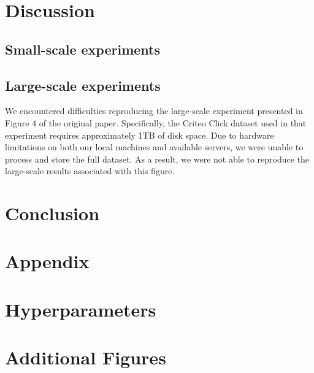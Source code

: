 \documentclass[a4paper,twocolumn]{article} %
\begin{document}
\section{Discussion}
\subsection{ Small-scale experiments}

\subsection{ Large-scale experiments}
We encountered difficulties reproducing the large-scale experiment presented in Figure 4 of the original paper. Specifically, the Criteo Click dataset used in that experiment requires approximately 1TB of disk space. 
Due to hardware limitations on both our local machines and available servers, we were unable to process and store the full dataset. 
As a result, we were not able to reproduce the large-scale results associated with this figure.

\section{Conclusion}





\clearpage
\appendix
\section*{Appendix}
\section{Hyperparameters}

\section{Additional Figures}
\end{document}
